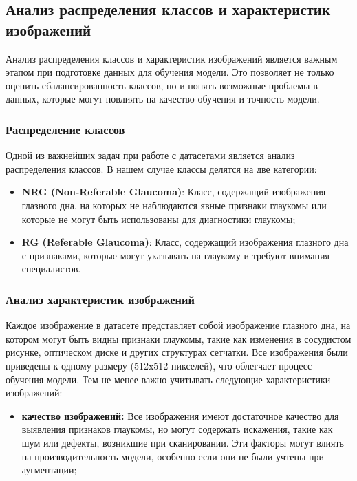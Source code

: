{    %

    \subsection{Анализ распределения классов и характеристик изображений}

    Анализ распределения классов и характеристик изображений является важным этапом при подготовке данных для обучения модели. Это позволяет не только оценить сбалансированность классов, но и понять возможные проблемы в данных, которые могут повлиять на качество обучения и точность модели.

    \subsubsection*{Распределение классов}

    Одной из важнейших задач при работе с датасетами является анализ распределения классов. В нашем случае классы делятся на две категории:
    \begin{itemize}
        \item \textbf{NRG (Non-Referable Glaucoma)}: Класс, содержащий изображения глазного дна, на которых не наблюдаются явные признаки глаукомы или которые не могут быть использованы для диагностики глаукомы;
        \item \textbf{RG (Referable Glaucoma)}: Класс, содержащий изображения глазного дна с признаками, которые могут указывать на глаукому и требуют внимания специалистов.
    \end{itemize}

    \subsubsection*{Анализ характеристик изображений}

    Каждое изображение в датасете представляет собой изображение глазного дна, на котором могут быть видны признаки глаукомы, такие как изменения в сосудистом рисунке, оптическом диске и других структурах сетчатки. Все изображения были приведены к одному размеру (512x512 пикселей), что облегчает процесс обучения модели. Тем не менее важно учитывать следующие характеристики изображений:

    \begin{itemize}
        \item \textbf{качество изображений:} Все изображения имеют достаточное качество для выявления признаков глаукомы, но могут содержать искажения, такие как шум или дефекты, возникшие при сканировании. Эти факторы могут влиять на производительность модели, особенно если они не были учтены при аугментации;
        

\end{itemize}}
